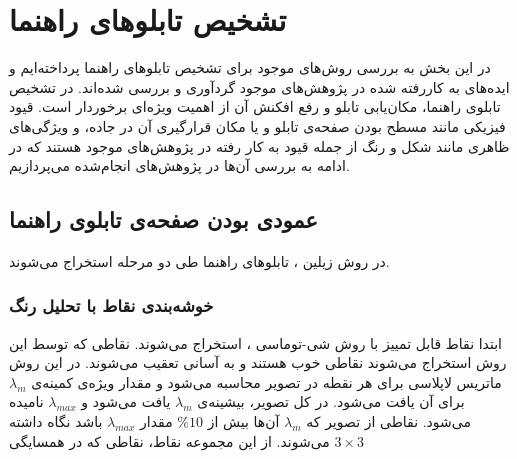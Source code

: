 \documentclass[oneside,openany,mscS]{SBU-Thesis}
\begin{document}
	\section{تشخیص تابلوهای راهنما}
	\label{sec:panelReview}
	
	در این بخش به بررسی روش‌های موجود برای تشخیص تابلوهای راهنما پرداخته‌ایم و ایده‌های به کاررفته شده در پژوهش‌های موجود گردآوری و بررسی شده‌اند. در تشخیص تابلوی راهنما، مکان‌یابی تابلو و رفع افکنش آن از اهمیت ویژه‌ای برخوردار است. قیود فیزیکی مانند مسطح بودن صفحه‌ی تابلو و یا مکان قرارگیری آن در جاده، و ویژگی‌های ظاهری مانند شکل و رنگ از جمله قیود به کار رفته در پژوهش‌های موجود هستند که در ادامه به بررسی آن‌ها در پژوهش‌های انجام‌شده می‌پردازیم. 
	
	\subsection{عمودی بودن صفحه‌ی تابلوی راهنما}
	
	در روش زیلین \cite{Wu2005}، تابلوهای راهنما طی دو مرحله استخراج می‌شوند. 
	
	
	
	\subsubsection{خوشه‌بندی نقاط با تحلیل رنگ}
	ابتدا نقاط قابل تمییز با روش شی-توماسی \cite{shi1994good}، استخراج می‌شوند. نقاطی که توسط این روش استخراج می‌شوند نقاطی خوب هستند و به آسانی تعقیب می‌شوند. در این روش ماتریس لاپلاسی برای هر نقطه در تصویر محاسبه می‌شود و مقدار ویژه‌ی کمینه‌ی $\lambda_m$ برای آن یافت می‌شود. در کل تصویر، بیشینه‌ی $\lambda_m$ یافت می‌شود و $\lambda_{max}$ نامیده می‌شود. نقاطی از تصویر که $\lambda_m$ آن‌ها بیش از 
	$\% 10$ 
	مقدار $\lambda_{max}$ باشد نگاه داشته می‌شوند. از این مجموعه نقاط، نقاطی که در همسایگی
	$ 3 \times 3 $ 
	
\end{document}
